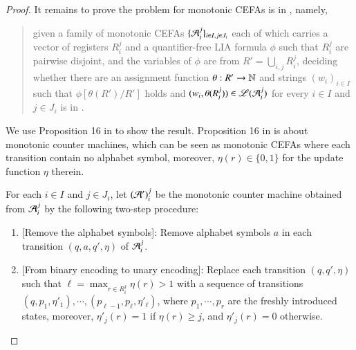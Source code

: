 \begin{proof}
	\smallskip
	
	It remains to prove the {\lasat} problem for monotonic CEFAs is in {\pspace}, namely,
	\begin{quote}
		given a family of monotonic CEFAs $\{ \mathcal{A}_i^{j} \}_{i\in I,j\in J_i}$ each of which carries a vector of registers $R_i^j$ and a quantifier-free LIA formula $\phi$ such that  $ R_i^{j} $ are pairwise disjoint,  and the variables of $\phi$ are from $R'=\bigcup_{i,j} R_i^j$, deciding whether  there are an assignment function $\theta: R' \rightarrow \mathbb{N}$ and strings $(w_i)_{i \in I}$ such that  $\phi[\theta(R' )/R']$ holds and $(w_i, \theta(R_i^j)) \in \mathscr{L}(\mathcal{A}_{i}^j)$ for every $i \in I$ and $j \in J_i$ is in {\pspace}.
	\end{quote}
	
	
	We use Proposition 16 in \cite{LB16} to show the result. Proposition 16 in \cite{LB16} is about monotonic counter machines, which can be seen as monotonic CEFAs where each transition contain no alphabet symbol, moreover, $\eta(r) \in \{0,1\}$ for the update function $\eta$ therein.
	
	For each $i\in I$ and $j\in J_i$, let $(\mathcal{A}')_i^j$ be the monotonic counter machine obtained from $\mathcal{A}_i^{j}$ by the following two-step procedure:
	\begin{enumerate}
		\item {[Remove the alphabet symbols]}: Remove alphabet symbols $a$ in each transition $(q, a, q', \eta)$ of $\mathcal{A}_i^{j}$.
		\item {[From binary encoding to unary encoding]}: Replace each transition $(q, q', \eta)$ such that $\ell = \max_{r \in R_i^j} \eta(r) > 1$ with a sequence of transitions $(q, p_1,\eta'_1), \cdots, (p_{\ell-1}, p_\ell, \eta'_\ell)$, where $p_1, \cdots,p_r$ are the freshly introduced states, moreover, $\eta'_j(r) = 1$ if $\eta(r) \ge j$, and $\eta'_j(r)=0$ otherwise. 
	\end{enumerate}
	

\end{proof}
